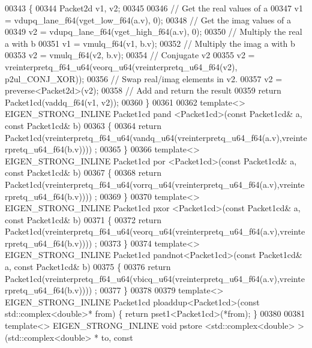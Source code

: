 \begin{DoxyCode}
00343 \{
00344   Packet2d v1, v2;
00345 
00346   \textcolor{comment}{// Get the real values of a }
00347   v1 = vdupq\_lane\_f64(vget\_low\_f64(a.v), 0);
00348   \textcolor{comment}{// Get the imag values of a}
00349   v2 = vdupq\_lane\_f64(vget\_high\_f64(a.v), 0);
00350   \textcolor{comment}{// Multiply the real a with b}
00351   v1 = vmulq\_f64(v1, b.v);
00352   \textcolor{comment}{// Multiply the imag a with b}
00353   v2 = vmulq\_f64(v2, b.v);
00354   \textcolor{comment}{// Conjugate v2 }
00355   v2 = vreinterpretq\_f64\_u64(veorq\_u64(vreinterpretq\_u64\_f64(v2), p2ul\_CONJ\_XOR));
00356   \textcolor{comment}{// Swap real/imag elements in v2.}
00357   v2 = preverse<Packet2d>(v2);
00358   \textcolor{comment}{// Add and return the result}
00359   \textcolor{keywordflow}{return} Packet1cd(vaddq\_f64(v1, v2));
00360 \}
00361 
00362 \textcolor{keyword}{template}<> EIGEN\_STRONG\_INLINE Packet1cd pand   <Packet1cd>(\textcolor{keyword}{const} Packet1cd& a, \textcolor{keyword}{const} Packet1cd& b)
00363 \{
00364   \textcolor{keywordflow}{return} Packet1cd(vreinterpretq\_f64\_u64(vandq\_u64(vreinterpretq\_u64\_f64(a.v),vreinterpretq\_u64\_f64(b.v))))
      ;
00365 \}
00366 \textcolor{keyword}{template}<> EIGEN\_STRONG\_INLINE Packet1cd por    <Packet1cd>(\textcolor{keyword}{const} Packet1cd& a, \textcolor{keyword}{const} Packet1cd& b)
00367 \{
00368   \textcolor{keywordflow}{return} Packet1cd(vreinterpretq\_f64\_u64(vorrq\_u64(vreinterpretq\_u64\_f64(a.v),vreinterpretq\_u64\_f64(b.v))))
      ;
00369 \}
00370 \textcolor{keyword}{template}<> EIGEN\_STRONG\_INLINE Packet1cd pxor   <Packet1cd>(\textcolor{keyword}{const} Packet1cd& a, \textcolor{keyword}{const} Packet1cd& b)
00371 \{
00372   \textcolor{keywordflow}{return} Packet1cd(vreinterpretq\_f64\_u64(veorq\_u64(vreinterpretq\_u64\_f64(a.v),vreinterpretq\_u64\_f64(b.v))))
      ;
00373 \}
00374 \textcolor{keyword}{template}<> EIGEN\_STRONG\_INLINE Packet1cd pandnot<Packet1cd>(\textcolor{keyword}{const} Packet1cd& a, \textcolor{keyword}{const} Packet1cd& b)
00375 \{
00376   \textcolor{keywordflow}{return} Packet1cd(vreinterpretq\_f64\_u64(vbicq\_u64(vreinterpretq\_u64\_f64(a.v),vreinterpretq\_u64\_f64(b.v))))
      ;
00377 \}
00378 
00379 \textcolor{keyword}{template}<> EIGEN\_STRONG\_INLINE Packet1cd ploaddup<Packet1cd>(\textcolor{keyword}{const} std::complex<double>* from) \{ \textcolor{keywordflow}{return} 
      pset1<Packet1cd>(*from); \}
00380 
00381 \textcolor{keyword}{template}<> EIGEN\_STRONG\_INLINE \textcolor{keywordtype}{void} pstore <std::complex<double> >(std::complex<double> *   to, \textcolor{keyword}{const} 

\end{DoxyCode}

